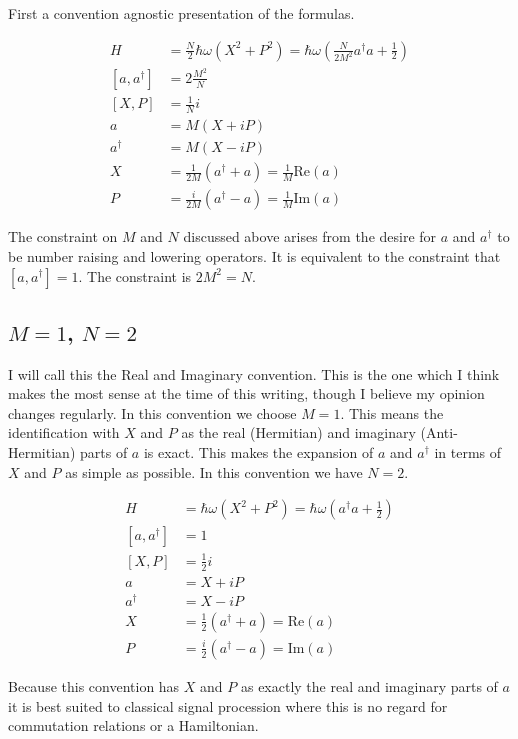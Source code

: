 \documentclass[12pt]{article}
\begin{document}
First a convention agnostic presentation of the formulas. 

\begin{align}
H &= \frac{N}{2}\hbar \omega (X^2 + P^2) = \hbar \omega \left(\frac{N}{2M^2}a^{\dag}a+\frac{1}{2}\right)\\
[a, a^{\dag}] &= 2\frac{M^2}{N}\\
[X,P] &= \frac{1}{N} i\\
a &= M(X + i P)\\
a^{\dag} &= M(X - i P)\\
X &= \frac{1}{2M}(a^{\dag} + a) = \frac{1}{M}\text{Re}(a)\\
P &= \frac{i}{2M}(a^{\dag} - a) = \frac{1}{M}\text{Im}(a)
\end{align}



The constraint on $M$ and $N$ discussed above arises from the desire for $a$ and $a^{\dag}$ to be number raising and lowering operators. It is equivalent to the constraint that $[a, a^{\dag}] = 1$. The constraint is $2M^2 = N$.

\subsection{$M=1$, $N=2$}
I will call this the Real and Imaginary convention. This is the one which I think makes the most sense at the time of this writing, though I believe my opinion changes regularly. In this convention we choose $M=1$. This means the identification with $X$ and $P$ as the real (Hermitian) and imaginary (Anti-Hermitian) parts of $a$ is exact. This makes the expansion of $a$ and $a^{\dag}$ in terms of $X$ and $P$ as simple as possible. In this convention we have $N=2$.

\begin{align}
H &= \hbar \omega (X^2 + P^2) = \hbar \omega \left(a^{\dag}a+\frac{1}{2}\right)\\
[a, a^{\dag}] &= 1\\
[X,P] &= \frac{1}{2}i\\
a &= X + i P\\
a^{\dag} &= X - i P\\
X &= \frac{1}{2}(a^{\dag} + a) = \text{Re}(a)\\
P &= \frac{i}{2}(a^{\dag} - a) = \text{Im}(a)
\end{align}

Because this convention has $X$ and $P$ as exactly the real and imaginary parts of $a$ it is best suited to classical signal procession where this is no regard for commutation relations or a Hamiltonian.
\end{document}
